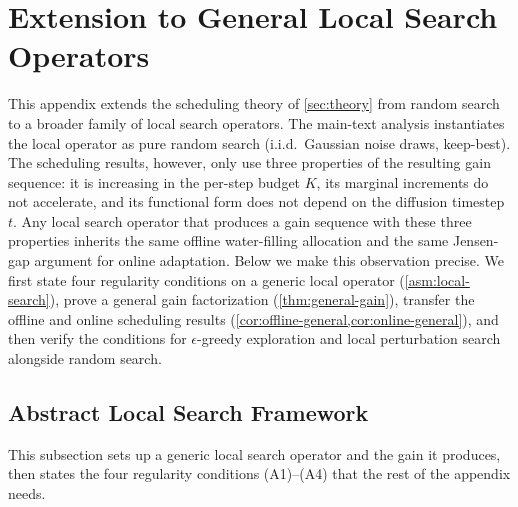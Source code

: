 \section{Extension to General Local Search Operators}
\label{sec:appendix-general}
%
This appendix extends the scheduling theory of \cref{sec:theory} from random search to a broader family of local search operators. The main-text analysis instantiates the local operator as pure random search (i.i.d.\ Gaussian noise draws, keep-best). The scheduling results, however, only use three properties of the resulting gain sequence: it is increasing in the per-step budget $K$, its marginal increments do not accelerate, and its functional form does not depend on the diffusion timestep $t$. Any local search operator that produces a gain sequence with these three properties inherits the same offline water-filling allocation and the same Jensen-gap argument for online adaptation. Below we make this observation precise. We first state four regularity conditions on a generic local operator (\cref{asm:local-search}), prove a general gain factorization (\cref{thm:general-gain}), transfer the offline and online scheduling results (\cref{cor:offline-general,cor:online-general}), and then verify the conditions for $\epsilon$-greedy exploration and local perturbation search alongside random search.
%
\subsection{Abstract Local Search Framework}
\label{sec:abstract-ls}
%
This subsection sets up a generic local search operator and the gain it produces, then states the four regularity conditions (A1)--(A4) that the rest of the appendix needs.

